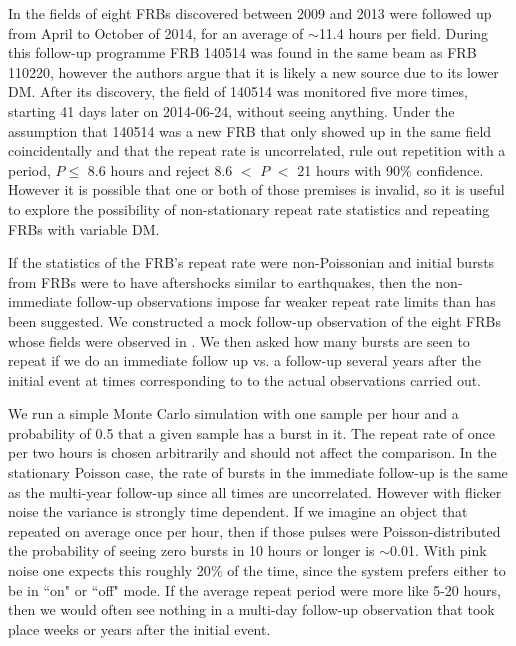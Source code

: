 \documentclass[useAMS,usenatbib]{mn2e}
\begin{document}
In \citep{2015MNRAS.454..457P}
the fields of eight FRBs discovered between 2009 and 2013
were followed up from April to October of 2014, for an average 
of $\sim$11.4 hours per field. During this follow-up programme 
FRB 140514 was found in the same beam as FRB 110220, however
the authors argue that it is likely a new source due to its lower DM. 
After its discovery, the field of 140514 was monitored 
five more times, starting 41 days later on 2014-06-24, without seeing anything.
Under the assumption that 140514 was a new FRB 
that only showed up in the same field 
coincidentally and that the repeat rate is uncorrelated,
 \cite{2015MNRAS.454..457P} rule out repetition with a period, $P \le$ 8.6 
hours and reject 8.6 $<$ $P$ $<$ 21 hours with 90$\%$ confidence.
However it is possible that one or both of those premises 
is invalid, so it is useful to explore the possibility of non-stationary 
repeat rate statistics and repeating FRBs with variable DM. 

If the statistics of the FRB's repeat rate were
non-Poissonian and initial bursts from FRBs were to have aftershocks
similar to earthquakes, then the non-immediate follow-up observations 
impose far weaker repeat rate limits than has been suggested. We 
constructed a mock follow-up observation of the eight FRBs whose
fields were observed in \citep{2015MNRAS.454..457P}. We then 
asked how many bursts are seen to repeat if we do an immediate
follow up vs. a follow-up several years after the initial event 
at times corresponding to 
to the actual observations carried out. 

We run a simple Monte Carlo 
simulation with one sample per hour and a probability of 0.5 
that a given sample has a burst in it. The repeat rate of once per two hours
is chosen arbitrarily and should not affect the comparison. 
In the stationary Poisson case, the rate of bursts in 
the immediate follow-up is the same as the multi-year follow-up 
since all times are 
uncorrelated. However with flicker noise 
the variance is strongly time dependent. If we imagine an object that 
repeated on average once per hour, then if those pulses were Poisson-distributed 
the probability of seeing zero bursts in 10 hours or longer is $\sim$0.01. With 
pink noise one expects this roughly 20$\%$ of the time, since the system 
prefers either to be in ``on" or ``off" mode. If the average repeat period were more 
like 5-20 hours, then we would often see nothing in a multi-day follow-up 
observation that took place weeks or years after the initial event.
\end{document}
